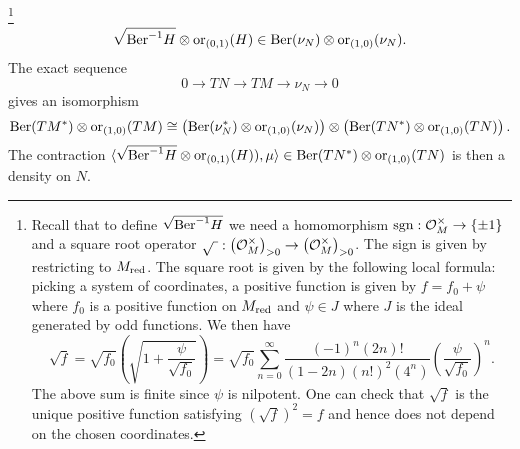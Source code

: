 \documentclass[11pt]{amsart}
\numberwithin{equation}{section}
\numberwithin{figure}{section}
\theoremstyle{plain}
\theoremstyle{definition}
\theoremstyle{remark}
\begin{document}
\footnote{\label{fn:Square_Root_on_Supermanifolds}Recall that to define $\sqrt{\mathrm{Ber}^{-1}H}$
we need a homomorphism $\mathrm{sgn}:\mathcal{O}_{M}^{\times}\rightarrow\{\pm1\}$ and a square
root operator $\sqrt{\ }:\left(\cO_{M}^{\times}\right)_{>0}\ra\left(\cO_{M}^{\times}\right)_{>0}$.
The sign is given by restricting to $M_{\mathrm{red}}$. The square root is
given by the following local formula: picking a system of coordinates,
a positive function is given by $f=f_{0}+\psi$ where $f_{0}$ is
a positive function on $M_{\mathrm{red}}$ and $\psi\in J$ where $J$ is
the ideal generated by odd functions. We then have 
\[
\sqrt{f}=\sqrt{f_{0}}\left(\sqrt{1+\frac{\psi}{\sqrt{f_{0}}}}\right)=\sqrt{f_{0}}\sum_{n=0}^{\infty}\frac{(-1)^{n}(2n)!}{(1-2n)(n!)^{2}(4^{n})}\left(\frac{\psi}{\sqrt{f_{0}}}\right)^{n}.
\]
The above sum is finite since $\psi$ is nilpotent. One can check
that $\sqrt{f}$ is the unique positive function satisfying $\left(\sqrt{f}\right)^{2}=f$
and hence does not depend on the chosen coordinates.%
} 
\[
\sqrt{\mathrm{Ber}^{-1}H}\otimes\mathrm{or}_{(0,1)}(H)\in\mathrm{Ber}(\nu_{N})\otimes\mathrm{or}_{(1,0)}(\nu_{N}).
\]
The exact sequence 
\[
0\rightarrow TN\rightarrow TM\rightarrow\nu_{N}\rightarrow0
\]
gives an isomorphism 
\[
\mathrm{Ber}(TM^{*})\otimes\mathrm{or}_{(1,0)}(TM)\cong\left(\mathrm{Ber}(\nu_{N}^{*})\otimes\mathrm{or}_{(1,0)}(\nu_{N})\right)\otimes\left(\mathrm{Ber}(TN^{*})\otimes\mathrm{or}_{(1,0)}(TN)\right).
\]
The contraction $\langle\sqrt{\mathrm{Ber}^{-1}H}\otimes\mathrm{or}_{(0,1)}(H)),\mu\rangle\in\mathrm{Ber}(TN^{*})\otimes\mathrm{or}_{(1,0)}(TN)$
is then a density on $N$. 
\end{document}
